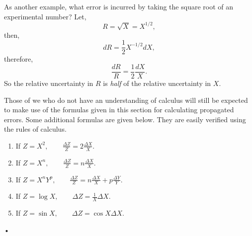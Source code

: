 \documentclass[main.tex]{subfiles}
\begin{document}
As another example, what error is incurred by taking the square root of an experimental number?  Let,
\[
R = \sqrt{X} = X^{1/2},
\]
then,
\[
dR=\frac{1}{2}X^{-1/2}dX,
\]
therefore,
\[
\frac{dR}{R}=\frac{1}{2}\frac{dX}{X}.
\]
So the relative uncertainty in $R$ is \emph{half} of the relative uncertainty in $X.$

Those of we who do not have an understanding of calculus will still be expected to make use of the formulas given in this section for calculating propagated errors.  Some additional formulas are given below.  They are easily verified using the rules of calculus.
\begin{enumerate}
\item
If $Z=X^2, \qquad \frac{\Delta Z}{Z} = 2\frac{\Delta X}{X}.$
\item
If $Z=X^n, \qquad \frac{\Delta Z}{Z} = n\frac{\Delta X}{X}.$
\item
If $Z=X^nY^p,\qquad \frac{\Delta Z}{Z}=n\frac{\Delta X}{X}+p\frac{\Delta Y}{Y}.$
\item
If $Z=\log{X}, \qquad \Delta Z = \frac{1}{X}\Delta X.$
\item
If $Z=\sin{X}, \qquad \Delta Z = \cos{X} \Delta X.$
\end{enumerate}•
\end{document}
